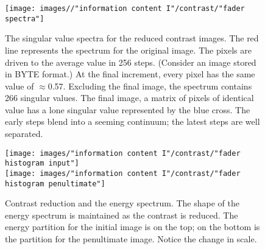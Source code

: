 \begin{figure}[htbp] %
   \centering
   \texttt{[image: images//"information content I"/contrast/"fader spectra"]} 
   \caption[The singular value spectra for the reduced contrast images]{The singular value spectra for the reduced contrast images. The red line represents the spectrum for the original image. The pixels are driven to the average value in 256 steps. (Consider an image stored in BYTE format.) At the final increment, every pixel has the same value of $\approx$0.57. Excluding the final image, the spectrum contains 266 singular values. The final image, a matrix of pixels of identical value has a lone singular value represented by the blue cross. The early steps blend into a seeming continuum; the latest steps are well separated.}
   \label{fig:contrast:singular values}
\end{figure}
\begin{figure}[htbp] %
   \centering
   \texttt{[image: images/"information content I"/contrast/"fader histogram input"]} \\[30pt]
   \texttt{[image: images/"information content I"/contrast/"fader histogram penultimate"]} 
   \caption[Contrast reduction and the energy spectrum]{Contrast reduction and the energy spectrum. The shape of the energy spectrum is maintained as the contrast is reduced. The energy partition for the initial image is on the top; on the bottom is the partition for the penultimate image. Notice the change in scale.}
   \label{fig:contrast:increments}
\end{figure}


\endinput